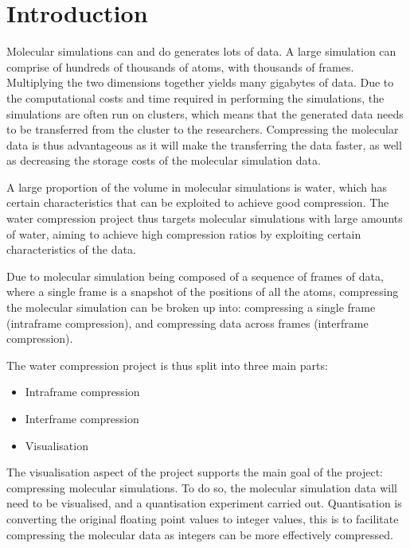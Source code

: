 \setcounter{page}{1}

\chapter{Introduction}
\label{cha:introduction}

Molecular simulations can and do generates lots of data. A large simulation can
comprise of hundreds of thousands of atoms, with thousands of frames.
Multiplying the two dimensions together yields many gigabytes of data. Due to
the computational costs and time required in performing the simulations, the
simulations are often run on clusters, which means that the generated data needs
to be transferred from the cluster to the researchers. Compressing the molecular
data is thus advantageous as it will make the transferring the data faster, as
well as decreasing the storage costs of the molecular simulation data.

A large proportion of the volume in molecular simulations is water, which has
certain characteristics that can be exploited to achieve good compression. The
water compression project thus targets molecular simulations with large amounts
of water, aiming to achieve high compression ratios by exploiting certain
characteristics of the data.

Due to molecular simulation being composed of a sequence of frames of data,
where a single frame is a snapshot of the positions of all the atoms,
compressing the molecular simulation can be broken up into: compressing a
single frame (intraframe compression), and compressing data across frames
(interframe compression).

The water compression project is thus split into three main parts:

\begin{itemize}
  \item Intraframe compression
  \item Interframe compression
  \item Visualisation
\end{itemize}

The visualisation aspect of the project supports the main goal of the project:
compressing molecular simulations. To do so, the molecular simulation data will
need to be visualised, and a quantisation experiment carried out. Quantisation
is converting the original floating point values to integer values, this is to
facilitate compressing the molecular data as integers can be more effectively
compressed.

